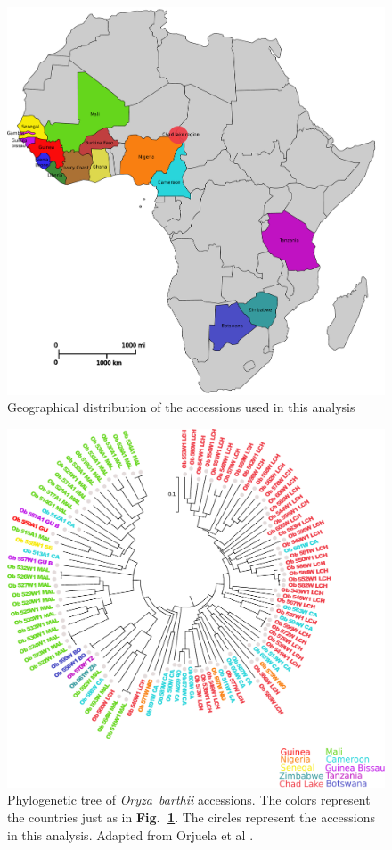 \documentclass[10pt,letterpaper]{article}
\begin{document}
\begin{figure}
\centering
 \includegraphics[scale=0.5]{MapAfricaWithCountries.pdf}
 \caption{Geographical distribution of the accessions used in this analysis}
 \label{MapAfricaWithCountries}
\end{figure}

\begin{figure}
\centering
 \includegraphics[scale=0.8]{BarthiiWithCountries.pdf}
 \caption{Phylogenetic tree of \emph{Oryza~barthii} accessions. The colors represent the countries just as in \textbf{Fig.~\ref{MapAfricaWithCountries}}. The circles represent the accessions in this analysis.
 Adapted from Orjuela et al \cite{Orjuela2014}.}
 \label{MapBar}
\end{figure}
\end{document}
